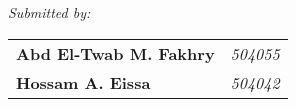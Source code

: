 {
  \centering
  \Large
  \textsl{Submitted by:} \\
  {
    \begin{tabular}{lr}
     \textbf{Abd El-Twab M. Fakhry} & \textsl{504055} \\
      \textbf{Hossam A. Eissa} & \textsl{504042}
    \end{tabular}
  }
  \par
}